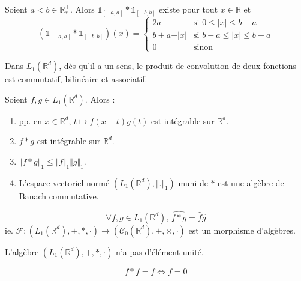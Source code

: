   \begin{example}
    Soient $a < b \in \mathbb{R}^+_*$. Alors $\mathbb{1}_{[-a, a]} * \mathbb{1}_{[-b,b]}$ existe pour tout $x \in \mathbb{R}$ et
    \[ \left( \mathbb{1}_{[-a, a]} * \mathbb{1}_{[-b,b]} \right)(x) =
    \begin{cases}
      2a &\text{si } 0 \leq \vert x \vert \leq b-a \\
      b+a-\vert x \vert &\text{si } b-a \leq \vert x \vert \leq b+a \\
      0 &\text{sinon}
    \end{cases}
    \]
  \end{example}

  \begin{proposition}
    Dans $L_1(\mathbb{R}^d)$, dès qu'il a un sens, le produit de convolution de deux fonctions est commutatif, bilinéaire et associatif.
  \end{proposition}

  \begin{theorem}
    Soient $f, g \in L_1(\mathbb{R}^d)$. Alors :
    \begin{enumerate}[label={\bfseries(\roman*)}]
      \item pp. en $x \in \mathbb{R}^d$, $t \mapsto f(x-t)g(t)$ est intégrable sur $\mathbb{R}^d$.
      \item $f * g$ est intégrable sur $\mathbb{R}^d$.
      \item $\Vert f * g \Vert_1 \leq \Vert f \Vert_1 \Vert g \Vert_1$.
      \item L'espace vectoriel normé $(L_1(\mathbb{R}^d), \Vert . \Vert_1)$ muni de $*$ est une algèbre de Banach commutative.
    \end{enumerate}
  \end{theorem}


  \begin{proposition}
    \[ \forall f, g \in L_1(\mathbb{R}^d), \, \widehat{f * g} = \widehat{f} \widehat{g} \]
    ie. $\mathcal{F} : (L_1(\mathbb{R}^d), +, *, \cdot) \rightarrow (\mathcal{C}_0(\mathbb{R}^d), +, \times, \cdot)$ est un morphisme d'algèbres.
  \end{proposition}

  \begin{corollary}
    L'algèbre $(L_1(\mathbb{R}^d), +, *, \cdot)$ n'a pas d'élément unité.
  \end{corollary}

  \begin{application}
    \[ f * f = f \iff f = 0 \]
  \end{application}

